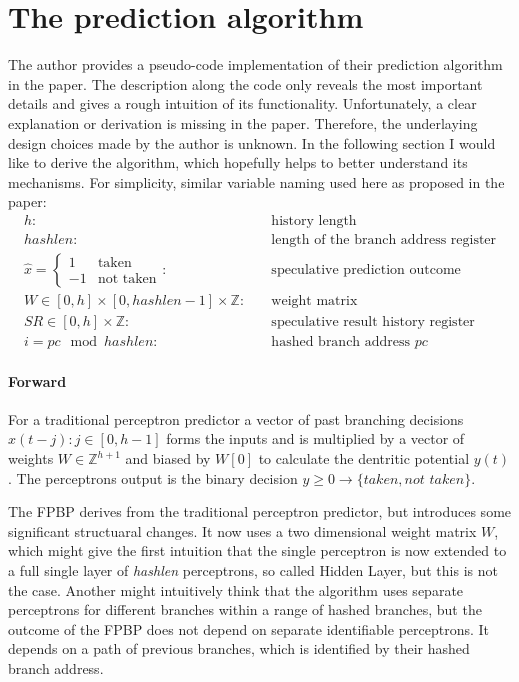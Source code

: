 \documentclass{article}
\begin{document}
\section{The prediction algorithm}
The author provides a pseudo-code implementation of their prediction algorithm in the paper. The description along the code only reveals the most important details and gives a rough intuition of its functionality. Unfortunately, a clear explanation or derivation is missing in the paper. Therefore, the underlaying design choices made by the author is unknown. In the following section I would like to derive the algorithm, which hopefully helps to better understand its mechanisms.
For simplicity, similar variable naming used here as proposed in the paper:
\begin{align*}
	h: \quad &\text{history length} \\%
	hashlen: \quad &\text{length of the branch address register} \\
	\hat{x} = \begin{cases} 1 & \text{taken} \\ -1 & \text{not taken} \end{cases} : \quad &\text{speculative prediction outcome} \\
	W \in [0,h] \times [0,hashlen - 1] \times \mathbb{Z}: \quad &\text{weight matrix} \\
	SR \in [0,h]\times \mathbb{Z} : \quad &\text{speculative result history register}  \\
	i = pc \mod hashlen : \quad &\text{hashed branch address } pc
\end{align*}
\paragraph{Forward}

For a traditional perceptron predictor a vector of past branching decisions $\hat{x}(t-j) : j \in [0,h-1]$ forms the inputs and is multiplied by a vector of weights $W \in \mathbb{Z}^{h+1}$ and biased by $W[0]$ to calculate the dentritic potential $y(t)$. The perceptrons output is the binary decision $y\geq0 \rightarrow \{\textit{taken}, \textit{not taken}\}$.

The FPBP derives from the traditional perceptron predictor, but introduces some significant structuaral changes. It now uses a two dimensional weight matrix $W$, which might give the first intuition that the single perceptron is now extended to a full single layer of \textit{hashlen} perceptrons, so called Hidden Layer, but this is not the case. Another might intuitively think that the algorithm uses separate perceptrons for different branches within a range of hashed branches, but the outcome of the FPBP does not depend on separate identifiable perceptrons. It depends on a path of previous branches, which is identified by their hashed branch address. 
\end{document}
